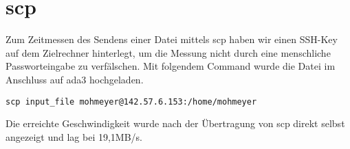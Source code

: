 \newpage

\section{scp}
Zum Zeitmessen des Sendens einer Datei mittels scp haben wir einen SSH-Key auf dem Zielrechner hinterlegt, um die Messung nicht durch eine menschliche Passworteingabe zu verfälschen. Mit folgendem Command wurde die Datei im Anschluss auf ada3 hochgeladen.

\begin{tcolorbox}[colback=gray!10,colframe=black,boxrule=0.5pt]
\begin{verbatim}
scp input_file mohmeyer@142.57.6.153:/home/mohmeyer
\end{verbatim}
\end{tcolorbox}

\noindent
Die erreichte Geschwindigkeit wurde nach der Übertragung von scp direkt selbst angezeigt und lag bei 19,1MB/s.